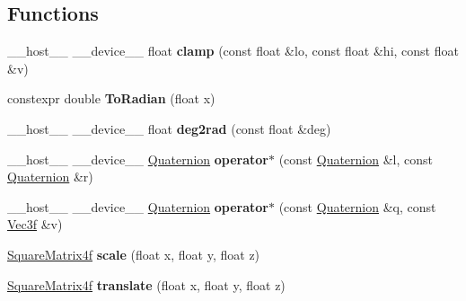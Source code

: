 \subsection*{Functions}
\begin{DoxyCompactItemize}
\item 
\+\_\+\+\_\+host\+\_\+\+\_\+ \+\_\+\+\_\+device\+\_\+\+\_\+ float {\bfseries clamp} (const float \&lo, const float \&hi, const float \&v)\hypertarget{group__linear__algebra_ga7ee7d7ce7cad4af28c138b6543fc1a81}{}\label{group__linear__algebra_ga7ee7d7ce7cad4af28c138b6543fc1a81}

\item 
constexpr double {\bfseries To\+Radian} (float x)\hypertarget{group__linear__algebra_ga542da6166501d65e2d6628718977b63f}{}\label{group__linear__algebra_ga542da6166501d65e2d6628718977b63f}

\item 
\+\_\+\+\_\+host\+\_\+\+\_\+ \+\_\+\+\_\+device\+\_\+\+\_\+ float {\bfseries deg2rad} (const float \&deg)\hypertarget{group__linear__algebra_gac2263452c984df58f61b1ef3bf96091a}{}\label{group__linear__algebra_gac2263452c984df58f61b1ef3bf96091a}

\item 
\+\_\+\+\_\+host\+\_\+\+\_\+ \+\_\+\+\_\+device\+\_\+\+\_\+ \hyperlink{class_quaternion}{Quaternion} {\bfseries operator$\ast$} (const \hyperlink{class_quaternion}{Quaternion} \&l, const \hyperlink{class_quaternion}{Quaternion} \&r)\hypertarget{group__linear__algebra_ga21d3945289653d0389e741626ab4e361}{}\label{group__linear__algebra_ga21d3945289653d0389e741626ab4e361}

\item 
\+\_\+\+\_\+host\+\_\+\+\_\+ \+\_\+\+\_\+device\+\_\+\+\_\+ \hyperlink{class_quaternion}{Quaternion} {\bfseries operator$\ast$} (const \hyperlink{class_quaternion}{Quaternion} \&q, const \hyperlink{class_vec3}{Vec3f} \&v)\hypertarget{group__linear__algebra_ga2b0200cc5ff257030068e52a4d60c5f7}{}\label{group__linear__algebra_ga2b0200cc5ff257030068e52a4d60c5f7}

\item 
\hyperlink{class_square_matrix4}{Square\+Matrix4f} {\bfseries scale} (float x, float y, float z)\hypertarget{group__linear__algebra_ga8c57bd9280eaaa89a0b823cdfd093b8f}{}\label{group__linear__algebra_ga8c57bd9280eaaa89a0b823cdfd093b8f}

\item 
\hyperlink{class_square_matrix4}{Square\+Matrix4f} {\bfseries translate} (float x, float y, float z)\hypertarget{group__linear__algebra_ga5f42c6034d55602dbab7e2306709dff0}{}\label{group__linear__algebra_ga5f42c6034d55602dbab7e2306709dff0}


\end{DoxyCompactItemize}
